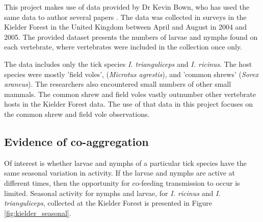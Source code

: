 \documentclass{article}
\begin{document}
This project makes use of data provided by Dr Kevin Bown, who has used the same data to author several papers \cite{Bown2008, bown2009, Bown2011}. The data was collected in surveys in the Kielder Forest in the United Kingdom between April and August in 2004 and 2005. The provided dataset presents the numbers of larvae and nymphs found on each vertebrate, where vertebrates were included in the collection once only. 

The data includes only the tick species \textit{I. trianguliceps} and  \textit{I. ricinus}. The host species were mostly 'field voles', (\textit{Microtus agrestis}), and 
'common shrews' (\textit{Sorex araneus}). The researchers also encountered small numbers of other small mammals. The common shrew and field voles vastly outnumber other vertebrate hosts in the Kielder Forest data. The use of that data in this project focuses on the common shrew and field vole observations. 

\subsection{Evidence of co-aggregation}

Of interest is whether larvae and nymphs of a particular tick species have the same seasonal variation in activity. If the larvae and nymphs are active at different times, then the opportunity for co-feeding transmission to occur is limited. Seasonal activity for nymphs and larvae, for \textit{I. ricinus} and \textit{I. trianguliceps}, collected at the Kielder Forest is presented in Figure \ref{fig:kielder_seasonal}.
\end{document}
